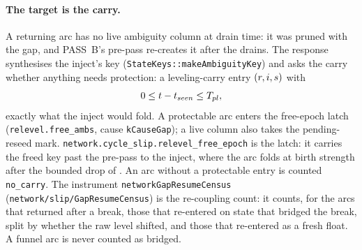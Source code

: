 \documentclass[main.tex]{subfiles}
\begin{document}
\paragraph{The target is the carry.}
A returning arc has no live ambiguity column at drain time: it was pruned
with the gap, and PASS~B's pre-pass re-creates it after the drains. The
response synthesises the inject's key (\texttt{StateKeys::makeAmbiguityKey})
and asks the carry whether anything needs protection: a leveling-carry
entry $(r,i,s)$ with
\begin{equation}
0 \le t - t_{seen} \le T_{pl} ,
\label{eq:wire-protect}
\end{equation}
exactly what the inject would fold. A protectable arc enters the
free-epoch latch (\texttt{relevel.free\_ambs}, cause
\texttt{kCauseGap}); a live column also takes the pending-reseed mark.
\texttt{network.cycle\_slip.relevel\_free\_epoch} is the latch: it carries
the freed key past the pre-pass to the inject, where the arc folds at
birth strength after the bounded drop of . An arc without a protectable entry is
counted \texttt{no\_carry}. The instrument \texttt{networkGapResumeCensus}
(\texttt{network/slip/GapResumeCensus}) is the re-coupling count: it
counts, for the arcs that returned after a break, those that re-entered on
state that bridged the break, split by whether the raw level shifted, and
those that re-entered as a fresh float. A funnel arc is never counted as
bridged.
\end{document}
